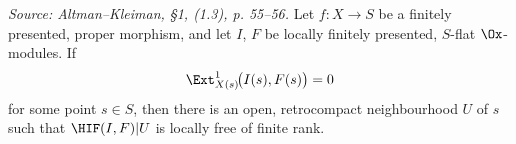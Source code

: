 \begin{theorem}
  \label{thm:H_locallyFree}
  \textit{Source: Altman--Kleiman, §1, (1.3), p. 55--56.}
  Let $f : X \to S$ be a finitely presented, proper morphism, and let $I$, $F$ be
  locally finitely presented, $S$-flat $\Ox$-modules. If
  \[
    \Ext^1_{X(s)}\!\big(I(s), F(s)\big) = 0
  \]
  for some point $s \in S$, then there is an open, retrocompact neighbourhood $U$
  of $s$ such that $\HIF(I,F)|U$ is locally free of finite rank.

\end{theorem}

